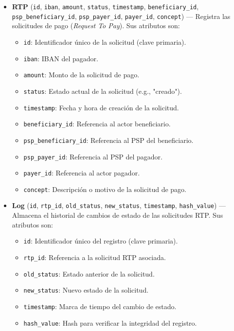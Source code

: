 \begin{itemize}
  \item \textbf{RTP} (\texttt{id}, \texttt{iban}, \texttt{amount}, \texttt{status}, \texttt{timestamp}, \texttt{beneficiary\_id}, \texttt{psp\_beneficiary\_id}, \texttt{psp\_payer\_id}, \texttt{payer\_id}, \texttt{concept}) --- Registra las solicitudes de pago (\emph{Request To Pay}). Sus atributos son:
    \begin{itemize}
      \item \texttt{id}: Identificador único de la solicitud (clave primaria).
      \item \texttt{iban}: IBAN del pagador.
      \item \texttt{amount}: Monto de la solicitud de pago.
      \item \texttt{status}: Estado actual de la solicitud (e.g., "creado").
      \item \texttt{timestamp}: Fecha y hora de creación de la solicitud.
      \item \texttt{beneficiary\_id}: Referencia al actor beneficiario.
      \item \texttt{psp\_beneficiary\_id}: Referencia al PSP del beneficiario.
      \item \texttt{psp\_payer\_id}: Referencia al PSP del pagador.
      \item \texttt{payer\_id}: Referencia al actor pagador.
      \item \texttt{concept}: Descripción o motivo de la solicitud de pago.
    \end{itemize}

  \item \textbf{Log} (\texttt{id}, \texttt{rtp\_id}, \texttt{old\_status}, \texttt{new\_status}, \texttt{timestamp}, \texttt{hash\_value}) --- Almacena el historial de cambios de estado de las solicitudes RTP. Sus atributos son:
    \begin{itemize}
      \item \texttt{id}: Identificador único del registro (clave primaria).
      \item \texttt{rtp\_id}: Referencia a la solicitud RTP asociada.
      \item \texttt{old\_status}: Estado anterior de la solicitud.
      \item \texttt{new\_status}: Nuevo estado de la solicitud.
      \item \texttt{timestamp}: Marca de tiempo del cambio de estado.
      \item \texttt{hash\_value}: Hash para verificar la integridad del registro.
    \end{itemize}
\end{itemize}

